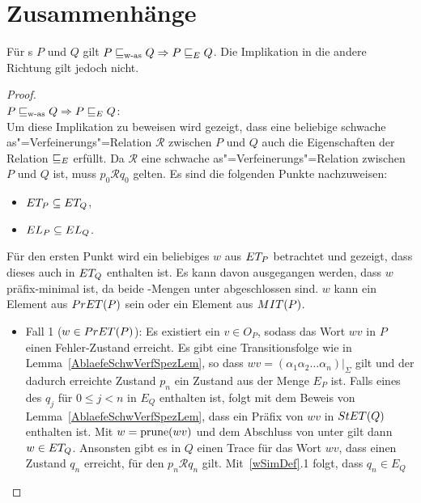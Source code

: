 \section{Zusammenhänge}

\begin{Satz}
  \label{ZusammenhFehlerSatz}
  Für \MEIO{}s $P$ und $Q$ gilt $P\sqsubseteq _{\mathrm{w}\text{-}\mathrm{as}} Q\Rightarrow P \sqsubseteq  _E Q$. Die
  Implikation in die andere Richtung gilt jedoch nicht.
\end{Satz}
\begin{proof}\mbox{}\\
  $P\sqsubseteq _{\mathrm{w}\text{-}\mathrm{as}} Q\Rightarrow P \sqsubseteq  _E Q$:\\
  Um diese Implikation zu beweisen wird gezeigt, dass eine beliebige
  schwache as"=Verfeinerungs"=Relation $\mathcal{R}$ zwischen $P$ und $Q$ auch
  die Eigenschaften der Relation $ \sqsubseteq  _E$ erfüllt. Da $\mathcal{R}$ eine
  schwache as"=Verfeinerungs"=Relation zwischen $P$ und $Q$ ist, muss $p_0
  \mathcal{R} q_0$ gelten. Es sind die folgenden Punkte nachzuweisen:
  \begin{itemize}
    \item $ET _P \subseteq ET _Q$,
    \item $EL _P \subseteq EL _Q$.
  \end{itemize}
  Für den ersten Punkt wird ein beliebiges $w$ aus $ET _P$ betrachtet und
  gezeigt, dass dieses auch in $ET _Q$ enthalten ist. Es kann davon
  ausgegangen werden, dass $w$ präfix-minimal ist, da beide \ET{}-Mengen unter
  \cont{} abgeschlossen sind. $w$ kann ein Element aus $PrET (P)$ sein oder
  ein Element aus $MIT (P)$.
  \begin{itemize}
    \item Fall 1 ($w\in PrET (P)$): Es existiert ein $v\in O_P$, sodass das
      Wort $wv$ in $P$ einen Fehler-Zustand erreicht. Es gibt eine
      Transitionsfolge wie in Lemma~\ref{AblaefeSchwVerfSpezLem}, so dass $wv =
      (\alpha _1\alpha _2\dots \alpha _n)|_{\Sigma}$ gilt und der dadurch
      erreichte Zustand $p_n$ ein Zustand aus der Menge $E_P$ ist. Falls eines
      des $q_j$ für $0 \leq j < n$ in $E_Q$ enthalten ist, folgt mit dem Beweis
      von Lemma~\ref{AblaefeSchwVerfSpezLem}, dass ein Präfix von $wv$ in
      $StET (Q)$ enthalten ist. Mit $w=\mathrm{prune} (wv)$ und dem Abschluss von
      \ET{} unter \cont{} gilt dann $w\in ET _Q$. Ansonsten gibt es in $Q$
      einen Trace für das Wort $wv$, dass einen Zustand $q_n$ erreicht, für den
      $p_n \mathcal{R} q_n$ gilt. Mit~\ref{wSimDef}.1 folgt, dass $q_n\in E_Q$

\end{itemize}
\end{proof}
